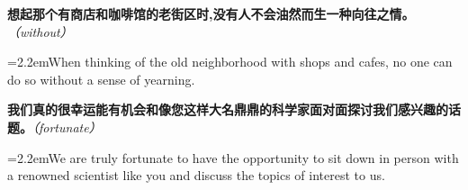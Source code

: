 \documentclass[11pt,a4paper]{article}
\newcommand{\num}[1]{\makebox[1.9em][r]{#1.}\hspace{0.3em}}
\newcommand{\prompt}[1]{\emph{\textcolor{tipblue}{\small（#1）}}}
\begin{document}
\begin{minipage}{\linewidth}

\num{7}\textbf{想起那个有商店和咖啡馆的老街区时,没有人不会油然而生一种向往之情。}\prompt{without}

\vspace{0.15em}

\noindent\hangindent=2.2em\hspace{2.2em}When thinking of the old neighborhood with shops and cafes, no one can do so without a sense of yearning.

\end{minipage}

\begin{minipage}{\linewidth}

\num{8}\textbf{我们真的很幸运能有机会和像您这样大名鼎鼎的科学家面对面探讨我们感兴趣的话题。}\prompt{fortunate}

\vspace{0.15em}

\noindent\hangindent=2.2em\hspace{2.2em}We are truly fortunate to have the opportunity to sit down in person with a renowned scientist like you and discuss the topics of interest to us.

\end{minipage}
\end{document}
